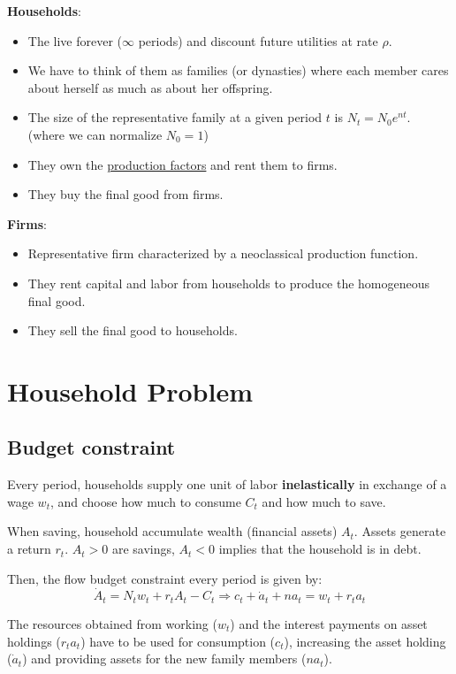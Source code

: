 \textbf{Households}: \begin{itemize}
    \item The live forever ($\infty $ periods) and discount future utilities at rate $\rho$.
    \item We have to think of them as families (or dynasties) where each member cares about herself as much as about her offspring.
    \item The size of the representative family at a given period $t$ is $N_t = N_0 e^{nt}$.\\(where we can normalize $N_0 = 1$)
    \item They own the \underline{production factors} and rent them to firms.
    \item They buy the final good from firms.
\end{itemize}

\textbf{Firms}: \begin{itemize}
    \item Representative firm characterized by a neoclassical production function.
    \item They rent capital and labor from households to produce the homogeneous final good.
    \item They sell the final good to households.
\end{itemize}

\section{Household Problem}

\subsection{Budget constraint}

Every period, households supply one unit of labor \textbf{inelastically} in exchange of a wage $w_t$, and choose how much to consume $C_t$ and how much to save.

When saving, household accumulate wealth (financial assets) $A_t$. Assets generate a return $r_t$. $A_t > 0$ are savings, $A_t < 0$ implies that the household is in debt.

Then, the flow budget constraint every period is given by: \[
    \dot{A}_t = N_tw_t+r_tA_t-C_t \Longrightarrow c_t + \dot{a}_t + na_t = w_t + r_ta_t
\]
\begin{remark*}[Interpretation]
    The resources obtained from working ($w_t$) and the interest payments on asset holdings ($r_ta_t$) have to be used for consumption ($c_t$), increasing the asset holding ($\dot{a}_t$) and providing assets for the new family members ($na_t$).
\end{remark*}

